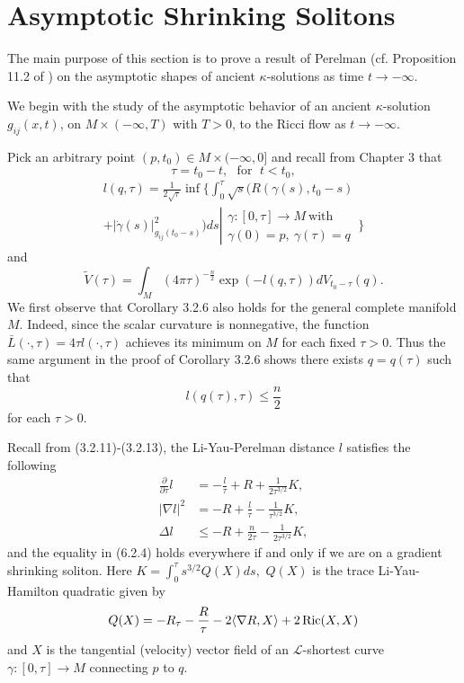 \section{Asymptotic Shrinking Solitons}
The main purpose of this section is to prove a result of Perelman
(cf. Proposition 11.2 of \cite{P1}) on the asymptotic shapes of
ancient $\kappa$-solutions as time $t \rightarrow -\infty$.


We begin with the study of the asymptotic behavior of an ancient
$\kappa$-solution $g_{ij}(x,t)$, on $M\times (-\infty,T)$ with
$T>0$, to the Ricci flow as $t\rightarrow-\infty$.

Pick an arbitrary point $(p,t_0)\in M\times(-\infty,0]$ and recall
from Chapter 3 that
$$
\tau=t_0-t,\ \ \ \mbox{for }\; t<t_0,
$$
\begin{multline*}
l(q,\tau)=\frac{1}{2\sqrt{\tau}}\inf \bigg\{
\int_0^\tau\sqrt{s}\Big(R(\gamma(s),t_0-s) \\
+|\dot{\gamma}(s)|^2_{g_{ij}(t_0-s)}\Big)ds \left|
\begin{array}{c}
\gamma:[0,\tau]\rightarrow M\ \mbox{with}\\[1mm]
\gamma(0)=p,\ \gamma(\tau)=q\
\end{array}\bigg\}\right.
\end{multline*}
and
$$
\tilde{V}(\tau)=\int_M(4\pi\tau)^{-\frac{n}{2}}
\exp(-l(q,\tau))dV_{t_0-\tau}(q).
$$
We first observe that Corollary 3.2.6 also holds for the general
complete manifold $M$. Indeed, since the scalar curvature is
nonnegative, the function $\bar{L}(\cdot,\tau)=4\tau
l(\cdot,\tau)$ achieves its minimum on $M$ for each fixed
$\tau>0$. Thus the same argument in the proof of Corollary 3.2.6
shows there exists $q=q(\tau)$ such that \begin{equation}
l(q(\tau),\tau)\leq\frac{n}{2} %
\end{equation} for each $\tau>0$.

Recall from (3.2.11)-(3.2.13), the Li-Yau-Perelman distance $l$
satisfies the following
\begin{align}
\frac{\partial}{\partial\tau}l
&=-\frac{l}{\tau}+R+\frac{1}{2\tau^{3/2}}K, \\  %
|\nabla l|^2&=-R+\frac{l}{\tau}-\frac{1}{\tau^{3/2}}K, \\  %
\Delta l& \leq-R+\frac{n}{2\tau}-\frac{1}{2\tau^{3/2}}K,  %
\end{align}
and the equality in (6.2.4) holds everywhere if and only if we are
on a gradient shrinking soliton. Here $K=\int_0^\tau
s^{3/2}Q(X)ds,$ $Q(X)$ is the trace Li-Yau-Hamilton quadratic
given by
$$
Q(X)=-R_{\tau} -\frac{R}{\tau}-2 \langle\nabla
R,X\rangle+2\operatorname{Ric}(X,X)
$$
and $X$ is the tangential (velocity) vector field of an
$\mathcal{L}$-shortest curve $\gamma: [0,\tau]\rightarrow M$
connecting $p$ to $q$.

